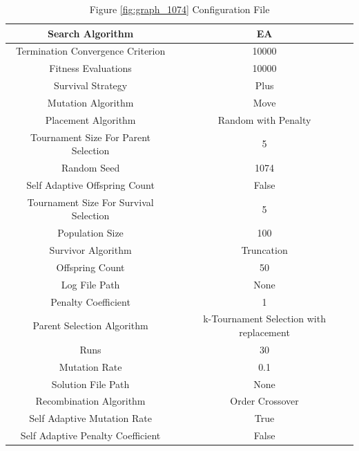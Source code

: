 \documentclass{standalone}
\begin{document}
\begin{table}[!htb]
	\centering
	\caption{Figure \ref{fig:graph_1074} Configuration File}
	\label{tab:graph_1074}
	\begin{tabular}{| c | c |}
		\hline
		Search Algorithm		& EA		 \\
		\hline
		Termination Convergence Criterion		& 10000		 \\
		\hline
		Fitness Evaluations		& 10000		 \\
		\hline
		Survival Strategy		& Plus		 \\
		\hline
		Mutation Algorithm		& Move		 \\
		\hline
		Placement Algorithm		& Random with Penalty		 \\
		\hline
		Tournament Size For Parent Selection		& 5		 \\
		\hline
		Random Seed		& 1074		 \\
		\hline
		Self Adaptive Offspring Count		& False		 \\
		\hline
		Tournament Size For Survival Selection		& 5		 \\
		\hline
		Population Size		& 100		 \\
		\hline
		Survivor Algorithm		& Truncation		 \\
		\hline
		Offspring Count		& 50		 \\
		\hline
		Log File Path		& None		 \\
		\hline
		Penalty Coefficient		& 1		 \\
		\hline
		Parent Selection Algorithm		& k-Tournament Selection with replacement		 \\
		\hline
		Runs		& 30		 \\
		\hline
		Mutation Rate		& 0.1		 \\
		\hline
		Solution File Path		& None		 \\
		\hline
		Recombination Algorithm		& Order Crossover		 \\
		\hline
		Self Adaptive Mutation Rate		& True		 \\
		\hline
		Self Adaptive Penalty Coefficient		& False		 \\
		\hline
	\end{tabular}
\end{table}
\end{document}
